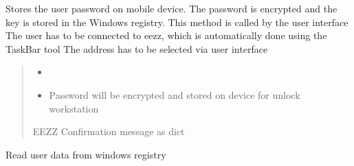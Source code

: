 \documentclass[letterpaper,10pt,english]{sphinxmanual}
\begin{document}
\begin{savenotes}
\begin{fulllineitems}
\begin{savenotes}\begin{fulllineitems}
\label{\detokenize{eezz:eezz.session.TSession.pair_device}}
\pysigstartsignatures
{}
\pysigstopsignatures
\sphinxAtStartPar
Stores the user password on mobile device. The password is encrypted and the key is stored in the
Windows registry. This method is called by the user interface
\sphinxhyphen{} The user has to be connected to eezz, which is automatically done using the TaskBar tool
\sphinxhyphen{} The address has to be selected via user interface
\begin{quote}\begin{description}
\begin{itemize}
\item {} 
\sphinxAtStartPar
{} \textendash{} 

\item {} 
\sphinxAtStartPar
{} \textendash{} Password will be encrypted and stored on device for unlock workstation

\end{itemize}

\sphinxAtStartPar
EEZZ Confirmation message as dict

\end{description}\end{quote}

\end{fulllineitems}\end{savenotes}


\begin{savenotes}\begin{fulllineitems}
\label{\detokenize{eezz:eezz.session.TSession.read_windows_registry}}
\pysigstartsignatures
{}
\pysigstopsignatures
\sphinxAtStartPar
Read user data from windows registry

\end{fulllineitems}\end{savenotes}


\end{fulllineitems}
\end{savenotes}
\end{document}
